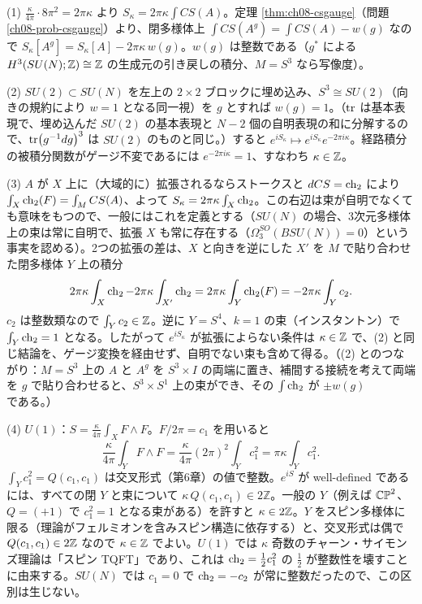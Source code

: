 \begin{solution}
(1) $\frac{\kappa}{4\pi}\cdot8\pi^2=2\pi\kappa$ より $S_\kappa=2\pi\kappa\int CS(A)$。定理 \ref{thm:ch08-csgauge}（問題 \ref{ch08-prob-csgauge}）より、閉多様体上 $\int CS(A^g)=\int CS(A)-w(g)$ なので $S_\kappa[A^g]=S_\kappa[A]-2\pi\kappa\,w(g)$。$w(g)$ は整数である（$g^*$ による $H^3(SU(N);\mathbb{Z})\cong\mathbb{Z}$ の生成元の引き戻しの積分、$M=S^3$ なら写像度）。

(2) $SU(2)\subset SU(N)$ を左上の $2\times2$ ブロックに埋め込み、$S^3\cong SU(2)$（向きの規約により $w=1$ となる同一視）を $g$ とすれば $w(g)=1$。（$\tr$ は基本表現で、埋め込んだ $SU(2)$ の基本表現と $N-2$ 個の自明表現の和に分解するので、$\tr(g^{-1}dg)^3$ は $SU(2)$ のものと同じ。）すると $e^{iS_\kappa}\mapsto e^{iS_\kappa}e^{-2\pi i\kappa}$。経路積分の被積分関数がゲージ不変であるには $e^{-2\pi i\kappa}=1$、すなわち $\kappa\in\mathbb{Z}$。

(3) $A$ が $X$ 上に（大域的に）拡張されるならストークスと $dCS=\operatorname{ch}_2$ により $\int_X\operatorname{ch}_2(F)=\int_MCS(A)$、よって $S_\kappa=2\pi\kappa\int_X\operatorname{ch}_2$。この右辺は束が自明でなくても意味をもつので、一般にはこれを定義とする（$SU(N)$ の場合、3次元多様体上の束は常に自明で、拡張 $X$ も常に存在する（$\Omega_3^{SO}(BSU(N))=0$）という事実を認める）。2つの拡張の差は、$X$ と向きを逆にした $X'$ を $M$ で貼り合わせた閉多様体 $Y$ 上の積分
\[
2\pi\kappa\int_X\operatorname{ch}_2-2\pi\kappa\int_{X'}\operatorname{ch}_2=2\pi\kappa\int_Y\operatorname{ch}_2(F)=-2\pi\kappa\int_Yc_2 .
\]
$c_2$ は整数類なので $\int_Yc_2\in\mathbb{Z}$。逆に $Y=S^4$、$k=1$ の束（インスタントン）で $\int_Y\operatorname{ch}_2=1$ となる。したがって $e^{iS_\kappa}$ が拡張によらない条件は $\kappa\in\mathbb{Z}$ で、(2) と同じ結論を、ゲージ変換を経由せず、自明でない束も含めて得る。（(2) とのつながり：$M=S^3$ 上の $A$ と $A^g$ を $S^3\times I$ の両端に置き、補間する接続を考えて両端を $g$ で貼り合わせると、$S^3\times S^1$ 上の束ができ、その $\int\operatorname{ch}_2$ が $\pm w(g)$ である。）

(4) $U(1)$：$S=\frac{\kappa}{4\pi}\int_XF\wedge F$。$F/2\pi=c_1$ を用いると
\[
\frac{\kappa}{4\pi}\int_YF\wedge F=\frac{\kappa}{4\pi}(2\pi)^2\int_Yc_1^2=\pi\kappa\int_Yc_1^2 .
\]
$\int_Yc_1^2=Q(c_1,c_1)$ は交叉形式（第6章）の値で整数。$e^{iS}$ が well-defined であるには、すべての閉 $Y$ と束について $\kappa\,Q(c_1,c_1)\in2\mathbb Z$。一般の $Y$（例えば $\mathbb{CP}^2$、$Q=(+1)$ で $c_1^2=1$ となる束がある）を許すと $\kappa\in2\mathbb{Z}$。$Y$ をスピン多様体に限る（理論がフェルミオンを含みスピン構造に依存する）と、交叉形式は偶で $Q(c_1,c_1)\in2\mathbb{Z}$ なので $\kappa\in\mathbb{Z}$ でよい。$U(1)$ では $\kappa$ 奇数のチャーン・サイモンズ理論は「スピン TQFT」であり、これは $\operatorname{ch}_2=\frac12c_1^2$ の $\frac12$ が整数性を壊すことに由来する。$SU(N)$ では $c_1=0$ で $\operatorname{ch}_2=-c_2$ が常に整数だったので、この区別は生じない。
\end{solution}
